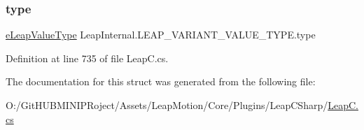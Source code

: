 \subsubsection{\texorpdfstring{type}{type}}
{\footnotesize\ttfamily \mbox{\hyperlink{namespace_leap_internal_a9c15e305893cd05c1ec6d65cea48737c}{e\+Leap\+Value\+Type}} Leap\+Internal.\+L\+E\+A\+P\+\_\+\+V\+A\+R\+I\+A\+N\+T\+\_\+\+V\+A\+L\+U\+E\+\_\+\+T\+Y\+P\+E.\+type}



Definition at line 735 of file Leap\+C.\+cs.



The documentation for this struct was generated from the following file\+:\begin{DoxyCompactItemize}
\item 
O\+:/\+Git\+H\+U\+B\+M\+I\+N\+I\+P\+Roject/\+Assets/\+Leap\+Motion/\+Core/\+Plugins/\+Leap\+C\+Sharp/\mbox{\hyperlink{_leap_c_8cs}{Leap\+C.\+cs}}\end{DoxyCompactItemize}
